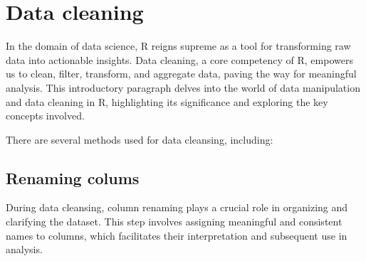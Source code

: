 \documentclass[
]{book}
\begin{document}
\hypertarget{data-cleaning}{%
\chapter{Data cleaning}\label{data-cleaning}}

In the domain of data science, R reigns supreme as a tool for transforming raw data into actionable insights.
Data cleaning, a core competency of R, empowers us to clean, filter, transform, and aggregate data, paving the way for meaningful analysis. This introductory paragraph delves into the world of data manipulation and data cleaning in R, highlighting its significance and exploring the key concepts involved.

There are several methods used for data cleansing, including:

\hypertarget{renaming-colums}{%
\section{Renaming colums}\label{renaming-colums}}

During data cleansing, column renaming plays a crucial role in organizing and clarifying the dataset. This step involves assigning meaningful and consistent names to columns, which facilitates their interpretation and subsequent use in analysis.
\end{document}
